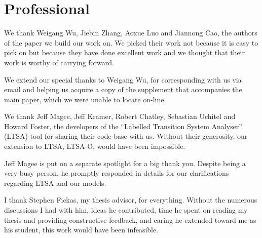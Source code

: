 \setcounter{tocdepth}{-10}
\section*{Professional}

\par
We thank Weigang Wu, Jiebin Zhang, Aoxue Luo and Jiannong Cao, the authors of the paper we build our work on. We picked their work not because it is easy to pick on but because they have done excellent work and we thought that their work is worthy of carrying forward.

\par
We extend our special thanks to Weigang Wu, for corresponding with us via email and helping us acquire a copy of the supplement that accompanies the main paper, which we were unable to locate on-line.

\par
We thank Jeff Magee,  Jeff Kramer,  Robert Chatley,  Sebastian Uchitel and Howard Foster, the developers of the ``Labelled Transition System Analyser'' (LTSA) tool for sharing their code-base with us. Without their generosity, our extension to LTSA, LTSA-O, would have been impossible.

\par
Jeff Magee is put on a separate spotlight for a big thank you. Despite being a very busy person, he promptly responded in details for our clarifications regarding LTSA and our models.

\par
I thank Stephen Fickas, my thesis advisor, for everything. Without the numerous discussions I had with him, ideas he contributed, time he spent on reading my thesis and providing constructive feedback, and caring he extended toward me as his student, this work would have been infeasible.

